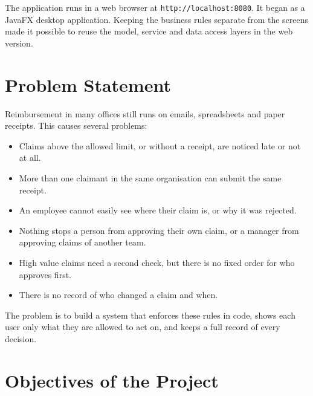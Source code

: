 \documentclass[12pt,a4paper]{report}
\begin{document}
The application runs in a web browser at \texttt{http://localhost:8080}. It began as a JavaFX desktop application. Keeping the business rules separate from the screens made it possible to reuse the model, service and data access layers in the web version.

\section{Problem Statement}

Reimbursement in many offices still runs on emails, spreadsheets and paper receipts. This causes several problems:

\begin{itemize}
  \item Claims above the allowed limit, or without a receipt, are noticed late or not at all.
  \item More than one claimant in the same organisation can submit the same receipt.
  \item An employee cannot easily see where their claim is, or why it was rejected.
  \item Nothing stops a person from approving their own claim, or a manager from approving claims of another team.
  \item High value claims need a second check, but there is no fixed order for who approves first.
  \item There is no record of who changed a claim and when.
\end{itemize}

The problem is to build a system that enforces these rules in code, shows each user only what they are allowed to act on, and keeps a full record of every decision.

\section{Objectives of the Project}
\end{document}
